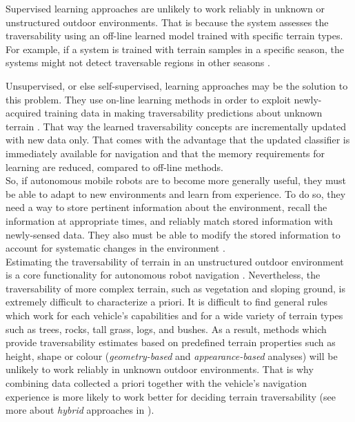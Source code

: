 \documentclass[12pt,a4paper]{report}
\newcommand{\term}{\textit}
\begin{document}
	Supervised learning approaches are unlikely to work reliably in unknown or 
	unstructured outdoor environments. That is because the system assesses the 
	traversability using an off-line learned model trained with specific 
	terrain types. For example, if a system is trained with terrain samples in a 
	specific season, the systems might not detect traversable regions in other 
	seasons \cite{Lee}.
	\par
	Unsupervised, or else self-supervised, learning approaches may be the solution 
	to this problem. They use on-line learning methods in order to exploit newly-
	acquired training data in making traversability predictions about unknown 
	terrain \cite{Kim}. That way the learned traversability concepts are 
	incrementally updated with new data only. That comes with the advantage that the 
	updated classifier is immediately available for navigation and that the memory 
	requirements for learning are reduced, compared to off-line methods.
	\\
	
	So, if autonomous mobile robots are to become more generally useful, they must 
	be able to adapt to new environments and learn from experience. To do so, they 
	need a way to store pertinent information about the environment, recall the 
	information at appropriate times, and reliably match stored information with 
	newly-sensed data. They also must be able to modify the stored information to 
	account for systematic changes in the environment \cite{Shneier}.
	\\
	
	Estimating the traversability of terrain in an unstructured outdoor 
	environment is a core functionality for autonomous robot navigation \cite{Kim}. 
	Nevertheless, the traversability of more complex terrain, such as 
	vegetation and sloping ground, is extremely difficult to characterize a priori. 
	It is difficult to find general rules which work for each vehicle's	capabilities
	and for a wide variety of terrain types such as trees, rocks, tall grass, logs, 
	and bushes. As a result, methods which provide traversability estimates 
	based on predefined terrain properties such as height, shape or colour 
	(\term{geometry-based} and \term{appearance-based} analyses) will be unlikely to 
	work reliably in unknown outdoor environments. That is why combining data 
	collected a priori together with the vehicle’s navigation experience is more 
	likely to work better for deciding terrain traversability (see more about 
	\term{hybrid} approaches in \cite{Papadakis}).
	\\
	
\end{document}
